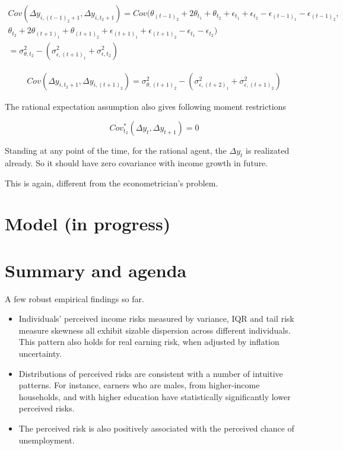 \documentclass[12pt,notitlepage,onecolumn,aps,pra]{article}
\providecommand{\tightlist}{%
      \setlength{\itemsep}{0pt}\setlength{\parskip}{0pt}}
\begin{document}
\begin{equation}
\begin{split}
Cov ( \Delta y_{i,(t-1)_2+1},\Delta y_{i,t_2+1}) = Cov(\theta_{(t-1)_2} + 2\theta_{t_1} + \theta_{t_2} + \epsilon_{t_1} + \epsilon_{t_2} - \epsilon_{(t-1)_1} - \epsilon_{(t-1)_2} , \\
\theta_{t_2} + 2\theta_{(t+1)_1} + \theta_{(t+1)_2} + \epsilon_{(t+1)_1} + \epsilon_{(t+1)_2} - \epsilon_{t_1} - \epsilon_{t_2} ) \\
= \sigma^2_{\theta,t_2}-(\sigma^2_{\epsilon,(t+1)_1} + \sigma^2_{\epsilon,t_2})
\end{split}
\end{equation}

\begin{equation}
\begin{split}
Cov ( \Delta y_{i,t_2+1},\Delta y_{i,(t+1)_2}) = \sigma^2_{\theta,(t+1)_2}-(\sigma^2_{\epsilon,(t+2)_1} + \sigma^2_{\epsilon,(t+1)_2})
\end{split}
\end{equation}

The rational expectation assumption also gives following moment
restrictions

\begin{equation}
Cov^*_{t_2}(\Delta y_t, \Delta y_{t+1}) = 0
\end{equation}

Standing at any point of the time, for the rational agent, the
\(\Delta y_t\) is realizated already. So it should have zero covariance
with income growth in future.

This is again, different from the econometrician's problem.

    \hypertarget{model-in-progress}{%
\section{Model (in progress)}\label{model-in-progress}}

    \hypertarget{summary-and-agenda}{%
\section{Summary and agenda}\label{summary-and-agenda}}

A few robust empirical findings so far.

\begin{itemize}
\tightlist
\item
  Individuals' perceived income risks measured by variance, IQR and tail
  risk measure skewness all exhibit sizable dispersion across different
  individuals. This pattern also holds for real earning risk, when
  adjusted by inflation uncertainty.
\item
  Distributions of perceived risks are consistent with a number of
  intuitive patterns. For instance, earners who are males, from
  higher-income households, and with higher education have statistically
  significantly lower perceived risks.
\item
  The perceived risk is also positively associated with the perceived
  chance of unemployment.
\end{itemize}
\end{document}
